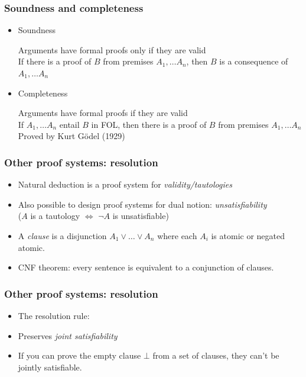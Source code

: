 \begin{frame}
    \frametitle{Soundness and completeness}

\begin{itemize}[<+->]
\item Soundness

Arguments have formal proofs only if they are valid\\
If there is a proof of $B$ from premises $ A_1, \dots A_n$, then $B$ is a consequence of $ A_1, \dots A_n$

\item Completeness

Arguments have formal proofs if they are valid\\
If $ A_1, \dots A_n$ entail $B$ in FOL, then there is a proof of $B$ from premises $ A_1, \dots A_n$\\[2ex]
Proved by Kurt G\"odel (1929)
\end{itemize}
\end{frame}

\begin{frame}
    \frametitle{Other proof systems: resolution}

    \begin{itemize}
\item Natural deduction is a proof system for \emph{validity/tautologies}
\item Also possible to design proof systems for dual notion: \emph{unsatisfiability}\\
($A$ is a tautology $\Leftrightarrow$ $\lnot A$ is unsatisfiable)
\item A \emph{clause} is a disjunction $ A_1 \lor \ldots \lor A_n$
where each $ A_i$ is atomic or negated atomic.
\item CNF theorem: every sentence is equivalent to a conjunction of clauses.
\end{itemize}
\end{frame}

\begin{frame}
  \frametitle{Other proof systems: resolution}

  \begin{itemize}
\item The resolution rule:
\begin{fitchproof}
\end{fitchproof}
\item Preserves \emph{joint satisfiability}
\item If you can prove the empty clause $\bot$ from a set of clauses, they can't be
jointly satisfiable.
\end{itemize}
\end{frame}


